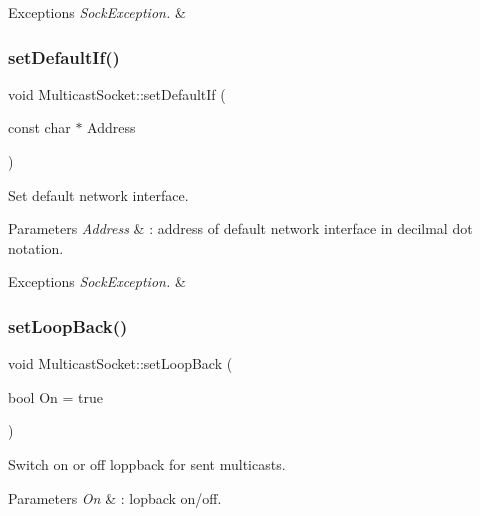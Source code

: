 \begin{DoxyExceptions}{Exceptions}
{\em Sock\+Exception.} & \\
\hline
\end{DoxyExceptions}
\mbox{\label{classMulticastSocket_abd769428b74a9dc88fca8c27bb53da1a}} 
\subsubsection{\texorpdfstring{set\+Default\+If()}{setDefaultIf()}\hspace{0.1cm}{\footnotesize\ttfamily [2/2]}}
{\footnotesize\ttfamily void Multicast\+Socket\+::set\+Default\+If (\begin{DoxyParamCaption}\item[{const char $\ast$}]{Address }\end{DoxyParamCaption})}

Set default network interface. 
\begin{DoxyParams}{Parameters}
{\em Address} & \+: address of default network interface in decilmal dot notation. \\
\hline
\end{DoxyParams}

\begin{DoxyExceptions}{Exceptions}
{\em Sock\+Exception.} & \\
\hline
\end{DoxyExceptions}
\mbox{\label{classMulticastSocket_a3f30553f778aa0bf541fc8d1c772e2e2}} 
\subsubsection{\texorpdfstring{set\+Loop\+Back()}{setLoopBack()}}
{\footnotesize\ttfamily void Multicast\+Socket\+::set\+Loop\+Back (\begin{DoxyParamCaption}\item[{bool}]{On = {\ttfamily true} }\end{DoxyParamCaption})}

Switch on or off loppback for sent multicasts. 
\begin{DoxyParams}{Parameters}
{\em On} & \+: lopback on/off. \\
\hline
\end{DoxyParams}

